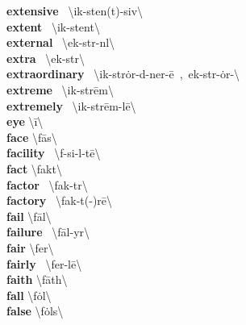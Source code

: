 \documentclass[10pt,a4paper]{article}
\begin{document}
\begin{multicols}{2}
\textbf{ extensive }\quad \ \textbackslash ik-\textprimstress sten(t)-siv\textbackslash \\
\textbf{ extent }\quad \ \textbackslash ik-\textprimstress stent\textbackslash \\
\textbf{ external }\quad \ \textbackslash ek-\textprimstress st\textschwa r-n\textsuperscript{\textreve}l\textbackslash \\
\textbf{ extra }\quad \ \textbackslash \textprimstress ek-str\textschwa \textbackslash \\
\textbf{ extraordinary }\quad \ \textbackslash ik-\textprimstress str\.{o}r-d\textschwa -\textsecstress ner-\={e}\ ,\ \textsecstress ek-str\textschwa -\textprimstress \.{o}r-\textbackslash \\
\textbf{ extreme }\quad \ \textbackslash ik-\textprimstress str\={e}m\textbackslash \\
\textbf{ extremely }\quad \ \textbackslash ik-\textprimstress str\={e}m-l\={e}\textbackslash \\
\textbf{ eye }\quad \textbackslash \textprimstress \={i}\textbackslash \\
\textbf{ face }\quad \textbackslash \textprimstress f\={a}s\textbackslash \\
\textbf{ facility }\quad \ \textbackslash f\textschwa -\textprimstress si-l\textschwa -t\={e}\textbackslash \\
\textbf{ fact }\quad \textbackslash \textprimstress fakt\textbackslash \\
\textbf{ factor }\quad \ \textbackslash \textprimstress fak-t\textschwa r\textbackslash \\
\textbf{ factory }\quad \ \textbackslash \textprimstress fak-t(\textschwa -)r\={e}\textbackslash \\
\textbf{ fail }\quad \textbackslash \textprimstress f\={a}l\textbackslash \\
\textbf{ failure }\quad \ \textbackslash \textprimstress f\={a}l-y\textschwa r\textbackslash \\
\textbf{ fair }\quad \textbackslash \textprimstress fer\textbackslash \\
\textbf{ fairly }\quad \ \textbackslash \textprimstress fer-l\={e}\textbackslash \\
\textbf{ faith }\quad \textbackslash \textprimstress f\={a}th\textbackslash \\
\textbf{ fall }\quad \textbackslash \textprimstress f\.{o}l\textbackslash \\
\textbf{ false }\quad \textbackslash \textprimstress f\.{o}ls\textbackslash \\

\end{multicols}
\end{document}

